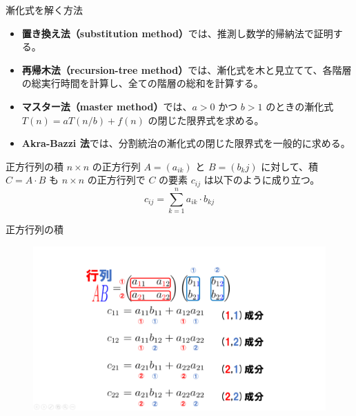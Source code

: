 \documentclass[unicode,11pt,aspectratio=169,notes]{beamer} %
\begin{document}
\begin{frame}{漸化式を解く方法}
  \begin{itemize}
    \item \textbf{置き換え法（substitution method）}では、推測し数学的帰納法で証明する。
    \item \textbf{再帰木法（recursion-tree method）}では、漸化式を木と見立てて、各階層
    の総実行時間を計算し、全ての階層の総和を計算する。
    \item \textbf{マスター法（master method）}では、$a>0$ かつ $b>1$ のときの漸化式
    $T(n) = aT(n/b)+f(n)$ の閉じた限界式を求める。
    \item \textbf{Akra-Bazzi 法}では、分割統治の漸化式の閉じた限界式を一般的に求める。
  \end{itemize}
\end{frame}


\begin{frame}{正方行列の積}
  $n\times n$ の正方行列 $A=(a_{ik})$ と $B=(b_kj)$ に対して、積 $C=A\cdot B$ も
  $n\times n$ の正方行列で $C$ の要素 $c_{ij}$ は以下のように成り立つ。
  \[
    c_{ij} = \sum_{k=1}^na_{ik}\cdot b_{kj}
  \]
\end{frame}

\begin{frame}{正方行列の積}
  \begin{figure}
    \includegraphics[height=0.8\textheight]{../resources/mat-mul}
  \end{figure}
\end{frame}
\end{document}
